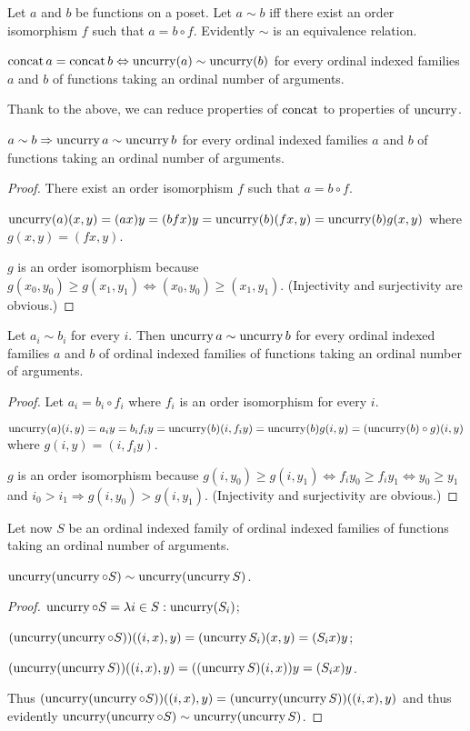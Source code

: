 Let $a$ and $b$ be functions on a poset. Let $a\sim b$ iff there
exist an order isomorphism $f$ such that $a=b\circ f$. Evidently
$\sim$ is an equivalence relation.
\begin{obvious}
$\operatorname{concat} a=\operatorname{concat} b\Leftrightarrow\operatorname{uncurry}(a)\sim\operatorname{uncurry}(b)$ for
every ordinal indexed families $a$ and $b$ of functions taking an
ordinal number of arguments.
\end{obvious}
Thank to the above, we can reduce properties of $\operatorname{concat}$ to properties
of $\operatorname{uncurry}$.
\begin{lem}
$a\sim b\Rightarrow\operatorname{uncurry} a\sim\operatorname{uncurry} b$ for every ordinal indexed
families $a$ and $b$ of functions taking an ordinal number of arguments.\end{lem}
\begin{proof}
There exist an order isomorphism $f$ such that $a=b\circ f$.

$\operatorname{uncurry}(a)(x,y)=(ax)y=(bfx)y=\operatorname{uncurry}(b)(fx,y)=\operatorname{uncurry}(b)g(x,y)$
where $g(x,y)=(fx,y)$.

$g$ is an order isomorphism because $g(x_{0},y_{0})\ge g(x_{1},y_{1})\Leftrightarrow(x_{0},y_{0})\ge(x_{1},y_{1})$.
(Injectivity and surjectivity are obvious.)\end{proof}
\begin{lem}
\label{by-member}Let $a_{i}\sim b_{i}$ for every $i$. Then $\operatorname{uncurry} a\sim\operatorname{uncurry} b$
for every ordinal indexed families $a$ and $b$ of ordinal indexed
families of functions taking an ordinal number of arguments.\end{lem}
\begin{proof}
Let $a_{i}=b_{i}\circ f_{i}$ where $f_{i}$ is an order isomorphism
for every $i$.

$\operatorname{uncurry}(a)(i,y)=a_{i}y=b_{i}f_{i}y=\operatorname{uncurry}(b)(i,f_{i}y)=\operatorname{uncurry}(b)g(i,y)=(\operatorname{uncurry}(b)\circ g)(i,y)$
where $g(i,y)=(i,f_{i}y)$.

$g$ is an order isomorphism because $g(i,y_{0})\ge g(i,y_{1})\Leftrightarrow f_{i}y_{0}\ge f_{i}y_{1}\Leftrightarrow y_{0}\ge y_{1}$
and $i_{0}>i_{1}\Rightarrow g(i,y_{0})>g(i,y_{1})$. (Injectivity
and surjectivity are obvious.)
\end{proof}
Let now $S$ be an ordinal indexed family of ordinal indexed families
of functions taking an ordinal number of arguments.
\begin{lem}
$\operatorname{uncurry}(\operatorname{uncurry}\circ S)\sim\operatorname{uncurry}(\operatorname{uncurry} S)$.\end{lem}
\begin{proof}
$\operatorname{uncurry}\circ S=\lambda i\in S:\operatorname{uncurry}(S_{i})$;

$(\operatorname{uncurry}(\operatorname{uncurry}\circ S))((i,x),y)=(\operatorname{uncurry} S_{i})(x,y)=(S_{i}x)y$;

$(\operatorname{uncurry}(\operatorname{uncurry} S))((i,x),y)=((\operatorname{uncurry} S)(i,x))y=(S_{i}x)y$.

Thus $(\operatorname{uncurry}(\operatorname{uncurry}\circ S))((i,x),y)=(\operatorname{uncurry}(\operatorname{uncurry} S))((i,x),y)$
and thus evidently $\operatorname{uncurry}(\operatorname{uncurry}\circ S)\sim\operatorname{uncurry}(\operatorname{uncurry} S)$.\end{proof}
